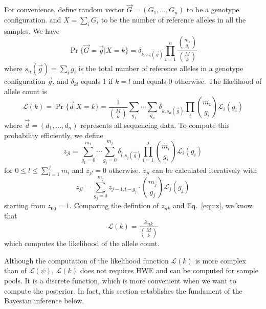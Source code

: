 \documentclass{bioinfo}
\begin{document}
\begin{methods}
For convenience, define random vector $\vec{G}=(G_1,\ldots,G_n)$ to be a genotype configuration.
and $X=\sum_iG_i$ to be the number of reference alleles in all the samples.
We have
$$
\Pr\{\vec{G}=\vec{g}|X=k\}=\delta_{k,s_n(\vec{g})}\prod_{i=1}^n\frac{\binom{m_i}{g_i}}{\binom{M}{k}}
$$
where $s_n(\vec{g})=\sum_i g_i$ is the total
number of reference alleles in a genotype configuration $\vec{g}$, and $\delta_{kl}$ equals 1 if $k=l$
and equals 0 otherwise. The likelihood of allele count is
\begin{equation}\label{equ:klk}
\mathcal{L}(k)=\Pr\{\vec{d}|X=k\}=\frac{1}{\binom{M}{k}}\sum_{g_1}\cdots\sum_{g_n}\delta_{k,s_n(\vec{g})}\prod_i\binom{m_i}{g_i}\mathcal{L}_i(g_i)
\end{equation}
where $\vec{d}=(d_1,\ldots,d_n)$ represents all sequencing data. To compute this probability efficiently, we define
$$
z_{jl}=\sum_{g_1=0}^{m_1}\cdots\sum_{g_j=0}^{m_j}\delta_{l,s_j(\vec{g})}\prod_{i=1}^j\binom{m_i}{g_i}\mathcal{L}_i(g_i)
$$
for $0\le l\le \sum_{i=1}^jm_i$ and $z_{jl}=0$ otherwise. $z_{jl}$
can be calculated iteratively with
\begin{equation}\label{equ:z}
z_{jl}=\sum_{g_j=0}^{m_j}z_{j-1,l-g_j}\cdot\binom{m_j}{g_j}\mathcal{L}_j(g_j)
\end{equation}
starting from $z_{00}=1$. Comparing the defintion of $z_{nk}$ and Eq.~\eqref{equ:z}, we know that
\begin{equation}\label{equ:klk2}
\mathcal{L}(k)=\frac{z_{nk}}{\binom{M}{k}}
\end{equation}
which computes the likelihood of the allele count.

Although the computation of the likelihood function $\mathcal{L}(k)$ is
more complex than of $\mathcal{L}(\psi)$, $\mathcal{L}(k)$ does not requires
HWE and can be computed for sample pools. It is a discrete function, which
is more convenient when we want to compute the posterior. In fact,
this section establishes the fundament of the Bayesian inference below.


\end{methods}
\end{document}
